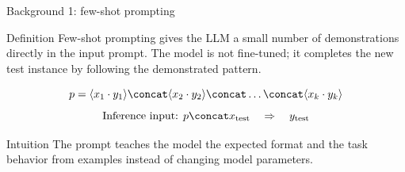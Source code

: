 \begin{frame}{Background 1: few-shot prompting}
\begin{block}{Definition}
Few-shot prompting gives the LLM a small number of demonstrations directly in the input prompt. The model is not fine-tuned; it completes the new test instance by following the demonstrated pattern.
\end{block}
\vspace{0.2cm}
\[
  p = \langle x_1 \cdot y_1 \rangle \concat \langle x_2 \cdot y_2 \rangle \concat \dots \concat \langle x_k \cdot y_k \rangle
\]
\[
  \text{Inference input: } p \concat x_{\text{test}} \quad \Rightarrow \quad y_{\text{test}}
\]
\vspace{0.2cm}
\begin{exampleblock}{Intuition}
The prompt teaches the model the expected format and the task behavior from examples instead of changing model parameters.
\end{exampleblock}
\end{frame}
